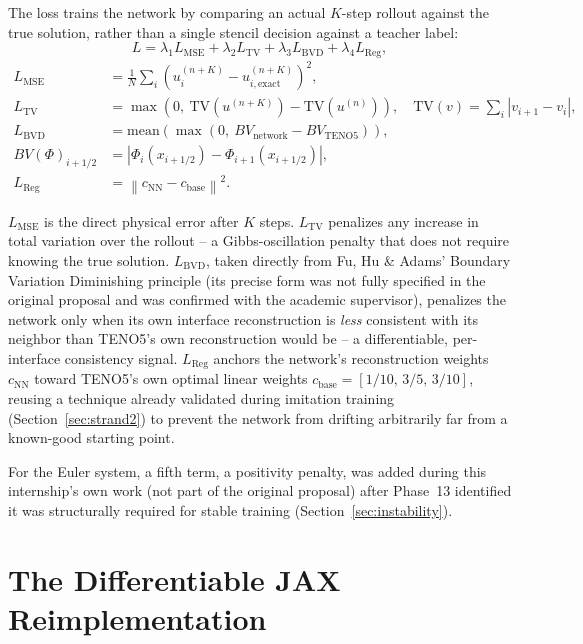 \documentclass[11pt]{article}
\begin{document}
The loss trains the network by comparing an actual $K$-step rollout against
the true solution, rather than a single stencil decision against a teacher
label:
\[
L = \lambda_1 L_{\text{MSE}} + \lambda_2 L_{\text{TV}}
  + \lambda_3 L_{\text{BVD}} + \lambda_4 L_{\text{Reg}},
\]
\begin{align*}
L_{\text{MSE}} &= \frac{1}{N}\sum_i \left(u_i^{(n+K)} - u_{i,\text{exact}}^{(n+K)}\right)^2, \\
L_{\text{TV}} &= \max\!\left(0,\ \mathrm{TV}(u^{(n+K)}) - \mathrm{TV}(u^{(n)})\right),
\quad \mathrm{TV}(v) = \sum_i |v_{i+1}-v_i|, \\
L_{\text{BVD}} &= \mathrm{mean}\!\left(\max\!\left(0,\ BV_{\text{network}} - BV_{\text{TENO5}}\right)\right), \\
BV(\Phi)_{i+1/2} &= \left|\Phi_i(x_{i+1/2}) - \Phi_{i+1}(x_{i+1/2})\right|, \\
L_{\text{Reg}} &= \left\| c_{\text{NN}} - c_{\text{base}} \right\|^2.
\end{align*}

$L_{\text{MSE}}$ is the direct physical error after $K$ steps.
$L_{\text{TV}}$ penalizes any increase in total variation over the
rollout -- a Gibbs-oscillation penalty that does not require knowing the
true solution. $L_{\text{BVD}}$, taken directly from Fu, Hu \& Adams'
Boundary Variation Diminishing principle (its precise form was not fully
specified in the original proposal and was confirmed with the academic
supervisor), penalizes the network only when its own interface
reconstruction is \emph{less} consistent with its neighbor than TENO5's
own reconstruction would be -- a differentiable, per-interface consistency
signal. $L_{\text{Reg}}$ anchors the network's reconstruction weights
$c_{\text{NN}}$ toward TENO5's own optimal linear weights $c_{\text{base}}
= [1/10,\,3/5,\,3/10]$, reusing a technique already validated during
imitation training (Section~\ref{sec:strand2}) to prevent the network from
drifting arbitrarily far from a known-good starting point.

For the Euler system, a fifth term, a positivity penalty, was added during
this internship's own work (not part of the original proposal) after
Phase~13 identified it was structurally required for stable training
(Section~\ref{sec:instability}).

\section{The Differentiable JAX Reimplementation}
\label{sec:jax}
\end{document}

